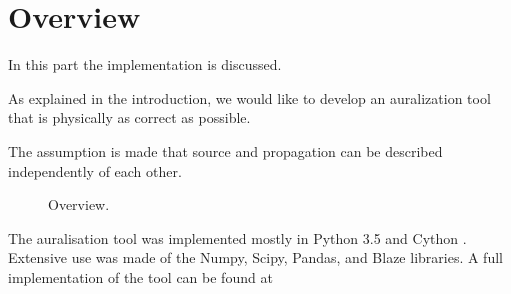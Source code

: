 \section{Overview}

In this part the implementation is discussed.

As explained in the introduction, we would like to develop an auralization tool that is physically as correct as possible.

The assumption is made that source and propagation can be 
described independently of each other. 


\begin{figure}[H]
  \centering
{}
  \caption{Overview.}
  \label{fig:implementation:overview}
\end{figure}


The auralisation tool was implemented mostly in Python 3.5 \cite{Python} and
Cython \cite{Behnel2011,Cython}. Extensive use was made of the Numpy\cite{VanderWalt2011,Numpy}, Scipy\cite{Scipy}, Pandas\cite{Mckinney2010},
and Blaze \cite{Blaze} libraries. A full implementation of the tool can be found at
\cite{Rietdijk2017d}
